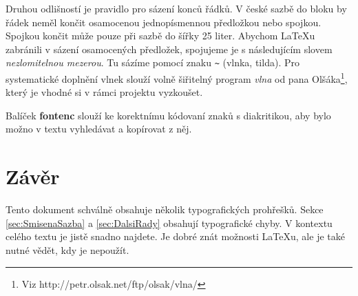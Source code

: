 \documentclass[10pt, a4paper, twocolumn]{article}
\begin{document}
Druhou odlišností je pravidlo pro sázení konců řádků.
V české sazbě do bloku by řádek neměl končit osamocenou jednopísmennou předložkou nebo spojkou.
Spojkou  končit může pouze při sazbě do šířky 25 liter.
Abychom \LaTeX u zabránili v sázení osamocených předložek, spojujeme je s následujícím slovem \emph{nezlomitelnou mezerou}.
Tu sázíme pomocí znaku \verb|~| (vlnka, tilda).
Pro systematické doplnění vlnek slouží volně šiřitelný program \emph{vlna} od pana Olšáka\footnote{Viz http://petr.olsak.net/ftp/olsak/vlna/}, který je vhodné si v rámci projektu vyzkoušet.

Balíček \textbf{fontenc} slouží ke korektnímu kódovaní znaků s diakritikou, aby bylo možno v textu vyhledávat a kopírovat z něj.

\section{Závěr}

Tento dokument schválně obsahuje několik typografických prohřešků.
Sekce \ref{sec:SmisenaSazba} a \ref{sec:DalsiRady} obsahují typografické chyby.
V kontextu celého textu je jistě snadno najdete.
Je dobré znát možnosti \LaTeX u, ale je také nutné vědět, kdy je nepoužít.
\end{document}
